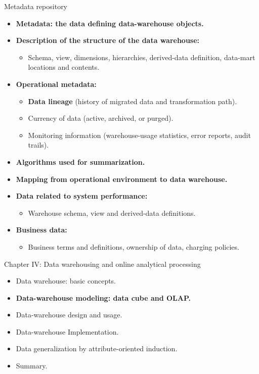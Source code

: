 \documentclass[aspectratio=169,t]{beamer}
\begin{document}
  { 
    \begin{frame}{Metadata repository}
    \begin{itemize}
      \item \textbf{Metadata: the data defining data-warehouse objects.}
      \item \textbf{Description of the {\color{airforceblue}structure} of the data warehouse:}
      \begin{itemize}
        \item Schema, view, dimensions, hierarchies, derived-data definition, data-mart locations and contents.
      \end{itemize}
      \item \textbf{{\color{airforceblue}Operational} metadata:}
      \begin{itemize}
        \item \textbf{\color{airforceblue}Data lineage} (history of migrated data and transformation path).
        \item Currency of data (active, archived, or purged).
        \item Monitoring information (warehouse-usage statistics, error reports, audit trails).
      \end{itemize}
      \item \textbf{{\color{airforceblue}Algorithms} used for summarization.}
      \item \textbf{{\color{airforceblue}Mapping} from operational environment to data warehouse.}
      \item \textbf{Data related to system performance:}
      \begin{itemize}
        \item Warehouse schema, view and derived-data definitions.
      \end{itemize}
      \item \textbf{Business data:}
      \begin{itemize}
        \item Business terms and definitions, ownership of data, charging policies.
      \end{itemize}
    \end{itemize}
    \end{frame}
  }

  { 
    \begin{frame}{Chapter IV: Data warehousing and online analytical processing}
        \begin{itemize}
            \item Data warehouse: basic concepts.
            \item \textbf{Data-warehouse modeling: data cube and OLAP.}
            \item Data-warehouse design and usage.
            \item Data-warehouse Implementation.
            \item Data generalization by attribute-oriented induction.
            \item Summary.
        \end{itemize}
    \end{frame}
  }
\end{document}
